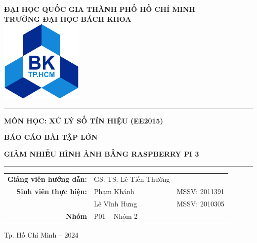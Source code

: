 \begin{titlepage}
    
    \begin{center}
    	\textbf{ĐẠI HỌC QUỐC GIA THÀNH PHỐ HỒ CHÍ MINH}\\[3pt]
    	\textbf{TRƯỜNG ĐẠI HỌC BÁCH KHOA}\\ 
    	
    	\vspace{1.5cm}
    	\includegraphics[width=4cm]{images/logo_BK.png}
    	\vspace{0.5cm}
    \end{center}
    
    \begin{center}
        \setlength{\parskip}{.5em}
        \par\noindent\rule{0.8\textwidth}{0.4pt}

        \textbf{{MÔN HỌC: XỬ LÝ SỐ TÍN HIỆU (EE2015)}}
        
        \textbf{{\large BÁO CÁO BÀI TẬP LỚN}}
    	    
        \textbf{{GIẢM NHIỄU HÌNH ẢNH BẰNG RASPBERRY PI 3}}
        \par\noindent\rule{0.8\textwidth}{0.4pt}
    \end{center}
    
    \vspace{1em}
    \begin{center}
        \renewcommand{\arraystretch}{1.5}
        \begin{tabular}{R{0.35} L{0.3} L{0.25}}
            \textbf{Giảng viên hướng dẫn:} & GS. TS. Lê Tiến Thường\\
            \textbf{Sinh viên thực hiện:} & Phạm Khánh & MSSV: 2011391\\
            & Lê Vĩnh Hưng & MSSV: 2010305\\
            \textbf{Nhóm} & P01 -- Nhóm 2 & 
        \end{tabular}
    \end{center}
    
    \vfill
    \begin{center}
        Tp. Hồ Chí Minh -- 2024
    \end{center}
    \vspace{1em}
\end{titlepage}